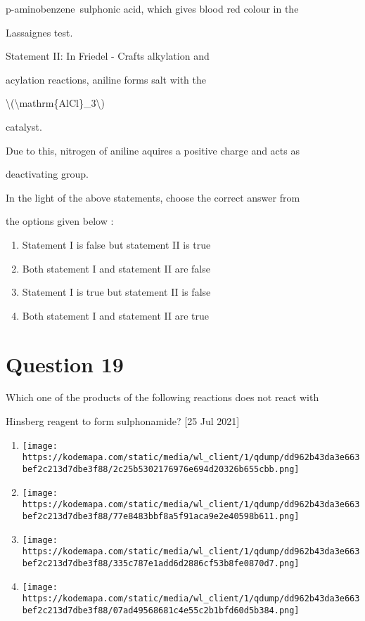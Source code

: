 \documentclass{article}
\begin{document}
p-aminobenzene~sulphonic acid, which gives blood red colour in the

\textquotesingle Lassaigne\textquotesingle s test\textquotesingle.\\

{Statement II: In Friedel - Craft\textquotesingle s alkylation and

acylation reactions, aniline forms salt with the

\textbackslash(\textbackslash mathrm\{AlCl\}\_3\textbackslash)

catalyst.\\

}{Due to this, nitrogen of aniline aquires a positive charge and acts as

deactivating group.\\

}{In the light of the above statements, choose the correct answer from

the options given below :}


\begin{enumerate}[label=(\alph*)]
\item Statement I is false but statement II is true


\item Both statement I and statement II are false


\item Statement I is true but statement II is false


\item Both statement I and statement II are true


\end{enumerate}
\newpage
\section*{Question 19}
Which one of the products of the following reactions does not react with

Hinsberg reagent to form sulphonamide? {[}25 Jul 2021{]}


\begin{enumerate}[label=(\alph*)]
\item \texttt{[image: https://kodemapa.com/static/media/wl\_client/1/qdump/dd962b43da3e663bef2c213d7dbe3f88/2c25b5302176976e694d20326b655cbb.png]}


\item \texttt{[image: https://kodemapa.com/static/media/wl\_client/1/qdump/dd962b43da3e663bef2c213d7dbe3f88/77e8483bbf8a5f91aca9e2e40598b611.png]}


\item \texttt{[image: https://kodemapa.com/static/media/wl\_client/1/qdump/dd962b43da3e663bef2c213d7dbe3f88/335c787e1add6d2886cf53b8fe0870d7.png]}


\item \texttt{[image: https://kodemapa.com/static/media/wl\_client/1/qdump/dd962b43da3e663bef2c213d7dbe3f88/07ad49568681c4e55c2b1bfd60d5b384.png]}


\end{enumerate}
\newpage
\end{document}
